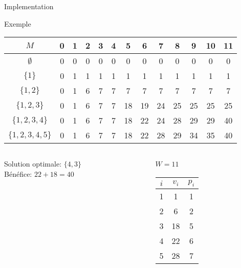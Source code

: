 \begin{frame}{Implementation}

{\small
\begin{center}
\end{center}
}


\end{frame}

\begin{frame}{Exemple}

\begin{tabular}{c|cccccccccccc}
$M$ & 0 & 1 & 2 & 3 & 4 & 5 & 6 & 7 & 8 & 9 & 10 & 11\\
\hline
$\emptyset$ &     {\color{red}0} & 0 & 0 & 0 & 0 & 0 & 0 & 0 & 0 & 0 & 0 & 0\\
$\{1\}$ &         {\color{red}0} & 1 & 1 & 1 & 1 & 1 & 1 & 1 & 1 & 1 & 1 & 1\\
$\{1,2\}$ &       {\color{red}0} & 1 & 6 & 7 & 7 & 7 & 7 & 7 & 7 & 7 & 7 & 7\\
$\{1,2,3\}$ &     0 & 1 & 6 & 7 & 7 & {\color{red}18}& 19& 24& 25& 25& 25& 25\\
$\{1,2,3,4\}$ &   0 & 1 & 6 & 7 & 7 & 18& 22& 24& 28& 29& 29& {\color{red}40}\\
$\{1,2,3,4,5\}$ & 0 & 1 & 6 & 7 & 7 & 18& 22& 28& 29& 34& 35& {\color{red}40}\\
\end{tabular}

\begin{columns}
\begin{column}{5cm}
Solution optimale: $\{4, 3\}$\\
Bénéfice: $22+18=40$
\end{column}
\begin{column}{5cm}
\begin{center}
$W=11$~~~~
\begin{tabular}{ccc}
$i$ & $v_i$ & $p_i$\\
\hline
1 & 1 & 1\\
2 & 6 & 2\\
3 & 18 & 5\\
4 & 22 & 6\\
5 & 28 & 7
\end{tabular}
\end{center}
\end{column}
\end{columns}

\end{frame}


